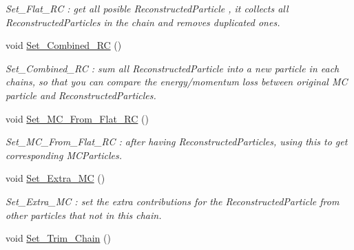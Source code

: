 \begin{DoxyCompactItemize}
\begin{DoxyCompactList}\small\item\em Set\_\-Flat\_\-RC : get all posible ReconstructedParticle , it collects all ReconstructedParticles in the chain and removes duplicated ones. \item\end{DoxyCompactList}\item 
void \hyperlink{classToolSet_1_1CChain__Single_a7474584ac9cbcaf32f0b046bd733756d}{Set\_\-Combined\_\-RC} ()
\begin{DoxyCompactList}\small\item\em Set\_\-Combined\_\-RC : sum all ReconstructedParticle into a new particle in each chains, so that you can compare the energy/momentum loss between original MC particle and ReconstructedParticles. \item\end{DoxyCompactList}\item 
\hypertarget{classToolSet_1_1CChain__Single_a1773179b963d71ba48df8060b4916a27}{
void \hyperlink{classToolSet_1_1CChain__Single_a1773179b963d71ba48df8060b4916a27}{Set\_\-MC\_\-From\_\-Flat\_\-RC} ()}
\label{classToolSet_1_1CChain__Single_a1773179b963d71ba48df8060b4916a27}

\begin{DoxyCompactList}\small\item\em Set\_\-MC\_\-From\_\-Flat\_\-RC : after having ReconstructedParticles, using this to get corresponding MCParticles. \item\end{DoxyCompactList}\item 
\hypertarget{classToolSet_1_1CChain__Single_a020fb2a7b3b6f65890f45b5bde4c7050}{
void \hyperlink{classToolSet_1_1CChain__Single_a020fb2a7b3b6f65890f45b5bde4c7050}{Set\_\-Extra\_\-MC} ()}
\label{classToolSet_1_1CChain__Single_a020fb2a7b3b6f65890f45b5bde4c7050}

\begin{DoxyCompactList}\small\item\em Set\_\-Extra\_\-MC : set the extra contributions for the ReconstructedParticle from other particles that not in this chain. \item\end{DoxyCompactList}\item 
\hypertarget{classToolSet_1_1CChain__Single_a0df29463b16a93b9c87226ce530519f5}{
void \hyperlink{classToolSet_1_1CChain__Single_a0df29463b16a93b9c87226ce530519f5}{Set\_\-Trim\_\-Chain} ()}
\label{classToolSet_1_1CChain__Single_a0df29463b16a93b9c87226ce530519f5}


\end{DoxyCompactItemize}
